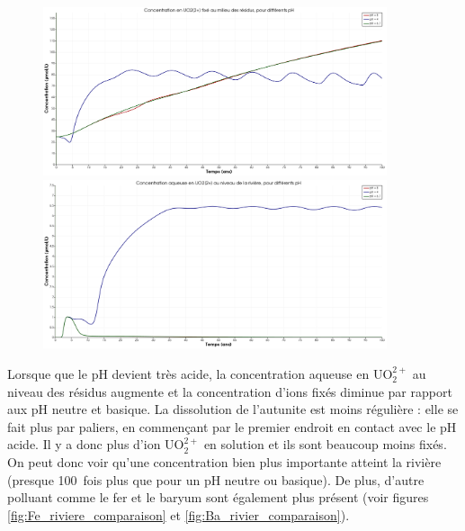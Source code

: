 \documentclass{article}
\begin{document}
\begin{figure}[H]
    \centering
    \begin{minipage}{0.5\textwidth}
        \centering
        \includegraphics[width=0.9\textwidth]{III_B_2_11.png} 
        \caption{}
        \label{fig:UO2_fixe_residus_comparaison}
    \end{minipage}\hfill
    \begin{minipage}{0.5\textwidth}
        \centering
        \includegraphics[width=0.9\textwidth]{III_B_2_12.png} 
        \caption{}
        \label{fig:UO2_riviere_comparaison}
    \end{minipage}
\end{figure}


Lorsque que le pH devient très acide, la concentration aqueuse en UO$_2^{2+}$ au niveau des résidus augmente et la concentration d’ions fixés diminue par rapport aux pH neutre et basique. La dissolution de l’autunite est moins régulière : elle se fait plus par paliers, en commençant par le premier endroit en contact avec le pH acide. Il y a donc plus d’ion UO$_2^{2+}$ en solution et ils sont beaucoup moins fixés. On peut donc voir qu’une concentration bien plus importante atteint la rivière (presque 100~fois plus que pour un pH neutre ou basique). De plus, d’autre polluant comme le fer et le baryum sont également plus présent (voir figures \ref{fig:Fe_riviere_comparaison} et \ref{fig:Ba_rivier_comparaison}).
\end{document}
